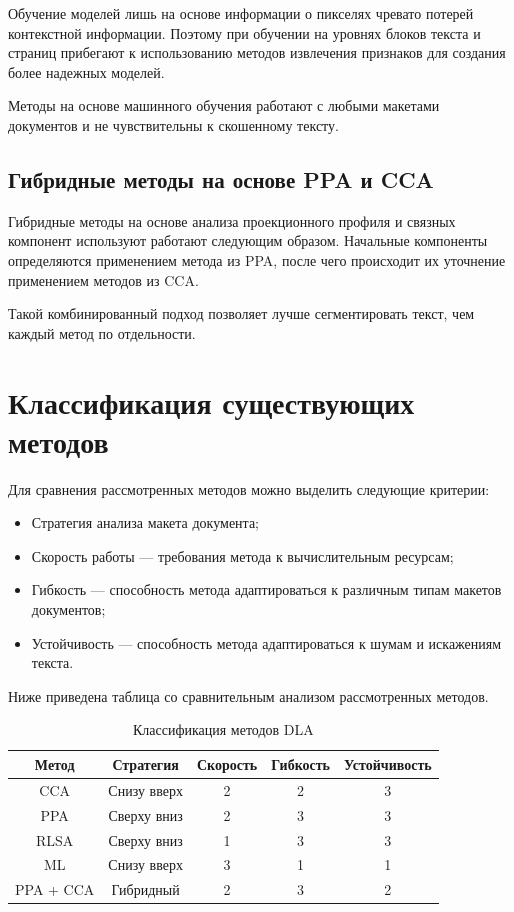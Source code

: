Обучение моделей лишь на основе информации о пикселях чревато потерей контекстной информации.
Поэтому при обучении на уровнях блоков текста и страниц прибегают к использованию методов извлечения признаков для создания более надежных моделей.~\cite{dla-survey}

Методы на основе машинного обучения работают с любыми макетами документов и не чувствительны к скошенному тексту.

\subsection{Гибридные методы на основе PPA и CCA}

Гибридные методы на основе анализа проекционного профиля и связных компонент используют работают следующим образом.
Начальные компоненты определяются применением метода из PPA, после чего происходит их уточнение применением методов из CCA.

Такой комбинированный подход позволяет лучше сегментировать текст, чем каждый метод по отдельности.

\section{Классификация существующих методов}

Для сравнения рассмотренных методов можно выделить следующие критерии:
\begin{itemize}
    \item Стратегия анализа макета документа;
    \item Скорость работы --- требования метода к вычислительным ресурсам;
    \item Гибкость --- способность метода адаптироваться к различным типам макетов документов;
    \item Устойчивость --- способность метода адаптироваться к шумам и искажениям текста.
\end{itemize}

Ниже приведена таблица со сравнительным анализом рассмотренных методов.

\begin{table}[H]
    \centering
    \caption{Классификация методов DLA}
    \label{tab:table}
    \begin{tabular}{|c|c|c|c|c|}
        \hline
        \textbf{Метод} & \textbf{Стратегия} & \textbf{Скорость} & \textbf{Гибкость} & \textbf{Устойчивость} \\ \hline
        CCA        & Снизу вверх & 2 & 2 & 3 \\ \hline
        PPA        & Сверху вниз & 2 & 3 & 3 \\ \hline
        RLSA       & Сверху вниз & 1 & 3 & 3 \\ \hline
        ML         & Снизу вверх & 3 & 1 & 1 \\ \hline
        PPA + CCA  & Гибридный   & 2 & 3 & 2 \\ \hline
    \end{tabular}
\end{table}
